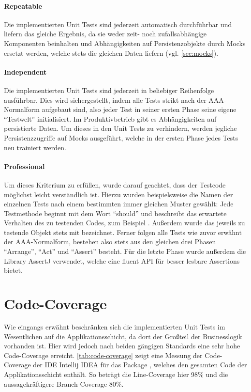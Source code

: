 \paragraph{Repeatable} Die implementierten Unit Tests sind jederzeit automatisch durchführbar und liefern das gleiche Ergebnis, da sie weder zeit- noch zufallsabhängige Komponenten beinhalten und Abhängigkeiten auf Persistenzobjekte durch Mocks ersetzt werden, welche stets die gleichen Daten liefern (vgl. \autoref{sec:mocks}).

\paragraph{Independent} Die implementierten Unit Tests sind jederzeit in beliebiger Reihenfolge ausführbar. Dies wird sichergestellt, indem alle Tests strikt nach der AAA-Normalform aufgebaut sind, also jeder Test in seiner ersten Phase seine eigene \enquote{Testwelt} initialisiert. Im Produktivbetrieb gibt es Abhängigkeiten auf persistierte Daten. Um dieses in den Unit Tests zu verhindern, werden jegliche Persistenzzugriffe auf Mocks ausgeführt, welche in der ersten Phase jedes Tests neu trainiert werden.

\paragraph{Professional} Um dieses Kriterium zu erfüllen, wurde darauf geachtet, dass der Testcode möglichst leicht verständlich ist. Hierzu wurden beispielsweise die Namen der einzelnen Tests nach einem bestimmten immer gleichen Muster gewählt: Jede Testmethode beginnt mit dem Wort \enquote{should} und beschreibt das erwartete Verhalten des zu testenden Codes, zum Beispiel \href{https://github.com/anditru/quickie/blob/bb41442c7f1ffbfcd3117cd86a40f7932e543a33/2-quickie-application/src/test/java/org/pinkcrazyunicorn/quickie/application/recipe/MatchingServiceTest.java#L21}{}. Außerdem wurde das jeweils zu testende Objekt stets mit  bezeichnet. Ferner folgen alle Tests wie zuvor erwähnt der AAA-Normalform, bestehen also stets aus den gleichen drei Phasen \enquote{Arrange}, \enquote{Act} und \enquote{Assert} besteht. Für die letzte Phase wurde außerdem die Library AssertJ verwendet, welche eine fluent \ac{API} für besser lesbare Assertions bietet.

\section{Code-Coverage}
\label{sec:code-coverage}
Wie eingangs erwähnt beschränken sich die implementierten Unit Tests im Wesentlichen auf die Applikationsschicht, da dort der Großteil der Businesslogik vorhanden ist. Hier wird jedoch nach beiden gängigen Standards eine sehr hohe Code-Coverage erreicht. \autoref{tab:code-coverage} zeigt eine Messung der Code-Coverage der \acs{IDE} Intellij IDEA für das Package , welches den gesamten Code der Applikationsschicht enthält. So beträgt die Line-Coverage hier 98\% und die aussagekräftigere Branch-Coverage 80\%. 

